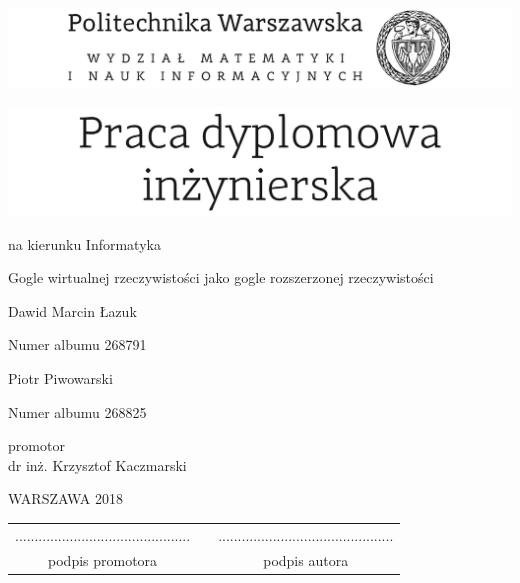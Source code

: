 \documentclass[12pt,twoside,a4paper]{article}
\def\discipline{Informatyka} %
\def\title{Gogle wirtualnej rzeczywistości jako gogle rozszerzonej rzeczywistości}
\def\authori{Dawid Marcin Łazuk}
\def\albumi{268791}
\def\authorii{Piotr Piwowarski}
\def\albumii{268825}
\def\supervisor{dr inż. Krzysztof Kaczmarski}
\def\year{2018}
\begin{document}
\sloppy
\pagestyle{empty}


\includegraphics[scale=1.]{politechnika} 

\begin{center}
\vspace{40pt}

\includegraphics[scale=1.]{praca_inz}  %

{ \arial na kierunku \discipline

\vspace{30pt}
{\arial \large \title}

\vspace{40pt}

{\arial \huge \authori }

\vspace{5pt}

Numer albumu \albumi

\vspace {20pt}
{\arial \huge \authorii}

\vspace{5pt}

Numer albumu \albumii

\vspace{40pt}

promotor \\
{\arial \supervisor}

\vspace{15pt}

 \vfill
WARSZAWA \year \\
}
\end{center}


\newpage
\null

\vfill

\begin{center}
\begin{tabular}[t]{ccc}
............................................. & \hspace*{100pt} & .............................................\\
podpis promotora & \hspace*{100pt} & podpis autora
\end{tabular}
\end{center}
\end{document}
